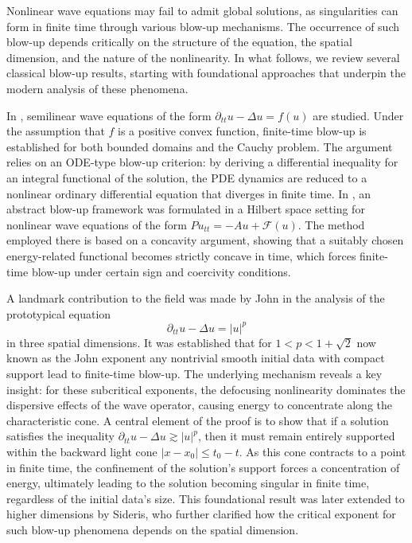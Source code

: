 \documentclass[11pt,reqno,oneside]{amsart}
\numberwithin{equation}{section}
\theoremstyle{definition}
\theoremstyle{remark}
\numberwithin{equation}{section}
\begin{document}
	Nonlinear wave equations may fail to admit global solutions, as singularities can form in finite time through various blow-up mechanisms. The occurrence of such blow-up depends critically on the structure of the equation, the spatial dimension, and the nature of the nonlinearity. In what follows, we review several classical blow-up results, starting with foundational approaches that underpin the modern analysis of these phenomena.
	
	In \cite{glassey1973blowup}, semilinear wave equations of the form $\partial_{tt}u-\Delta u=f(u)$ are studied. Under the assumption that $f$ is a positive convex function, finite-time blow-up is established for both bounded domains and the Cauchy problem. The argument relies on an ODE-type blow-up criterion: by deriving a differential inequality for an integral functional of the solution, the PDE dynamics are reduced to a nonlinear ordinary differential equation that diverges in finite time. In \cite{levine1974}, an abstract blow-up framework was formulated in a Hilbert space setting for nonlinear wave equations of the form $Pu_{tt}=-Au+\mathcal{F}(u)$. The method employed there is based on a concavity argument, showing that a suitably chosen energy-related functional becomes strictly concave in time, which forces finite-time blow-up under certain sign and coercivity conditions.
	
	A landmark contribution to the field was made by John \cite{John} in the analysis of the prototypical equation  
	$$
	\partial_{tt}u-\Delta u =|u|^p
	$$  
	in three spatial dimensions. It was established that for $1<p<1+\sqrt{2}$ now known as the John exponent any nontrivial smooth initial data with compact support lead to finite-time blow-up. The underlying mechanism reveals a key insight: for these subcritical exponents, the defocusing nonlinearity dominates the dispersive effects of the wave operator, causing energy to concentrate along the characteristic cone. A central element of the proof is to show that if a solution satisfies the inequality $\partial_{tt}u-\Delta u \gtrsim |u|^p$, then it must remain entirely supported within the backward light cone $|x-x_0| \leq t_0 - t$. As this cone contracts to a point in finite time, the confinement of the solution's support forces a concentration of energy, ultimately leading to the solution becoming singular in finite time, regardless of the initial data's size. This foundational result was later extended to higher dimensions by Sideris\cite{Sideris}, who further clarified how the critical exponent for such blow-up phenomena depends on the spatial dimension.
	
\end{document}
